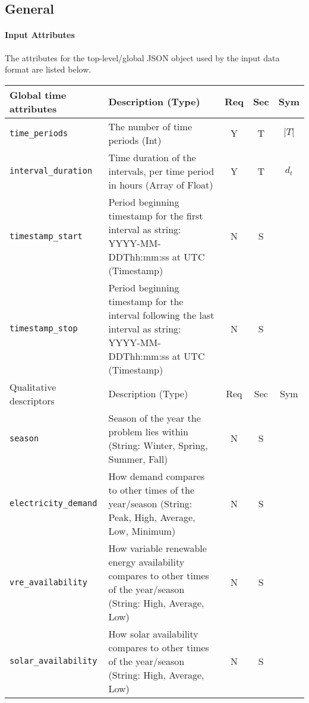 \documentclass{article}
\begin{document}
\subsection{General}
\label{nom:top-level}

\paragraph{Input Attributes}
The attributes for the top-level/global JSON object
used by the input data format are listed below.

\begin{center}
\small
\begin{tabular}{ l | p{3.5in} | c | c | c |}
Global time attributes & Description (Type) & Req & Sec & Sym\\
\hline
  {\tt time\_periods} & The number of time periods (Int) & Y & T & $\lvert T \rvert$ \\
  {\tt interval\_duration} & Time duration of the intervals, per time period in hours (Array of Float) & Y & T & $d_t$ \\
                           \hline
 {\tt timestamp\_start} & Period beginning timestamp for the first interval as string: YYYY-MM-DDThh:mm:ss at UTC (Timestamp)& N & S & \\   
 {\tt timestamp\_stop} & Period beginning timestamp for the interval following the last interval as string: YYYY-MM-DDThh:mm:ss at UTC (Timestamp)& N & S & \\
\hline
Qualitative descriptors & Description (Type) & Req & Sec & Sym\\
\hline
  {\tt season} & Season of the year the problem lies within (String: Winter, Spring, Summer, Fall) & N & S & \\
  {\tt electricity\_demand} & How demand compares to other times of the year/season (String: Peak, High, Average, Low, Minimum) & N & S & \\
  {\tt vre\_availability} & How variable renewable energy availability compares to other times of the year/season (String: High, Average, Low) & N & S & \\
  {\tt solar\_availability} & How solar availability compares to other times of the year/season (String: High, Average, Low) & N & S & \\

\end{tabular}
\end{center}
\end{document}
